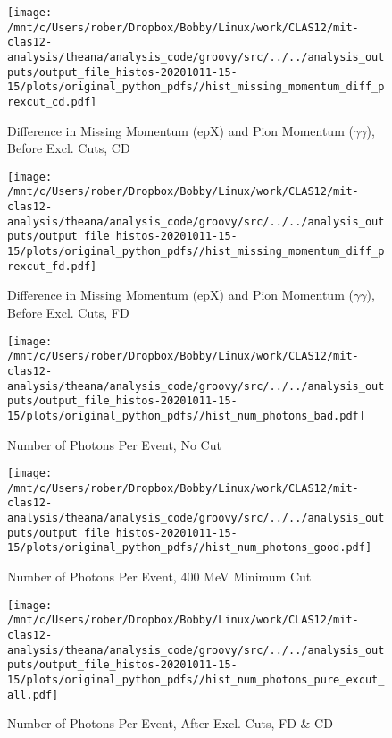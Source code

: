 \documentclass{article}
\begin{document}
\begin{landscape}
\begin{figure}[h]
        \texttt{[image: /mnt/c/Users/rober/Dropbox/Bobby/Linux/work/CLAS12/mit-clas12-analysis/theana/analysis\_code/groovy/src/../../analysis\_outputs/output\_file\_histos-20201011-15-15/plots/original\_python\_pdfs//hist\_missing\_momentum\_diff\_prexcut\_cd.pdf]}
        \captionsetup{textformat=empty,labelformat=blank}
        \caption{Difference in Missing Momentum (epX) and Pion Momentum ($\gamma$$\gamma$), Before Excl. Cuts, CD}
    \end{figure}
    \clearpage
    
    \begin{figure}[h]
        \centering

        \texttt{[image: /mnt/c/Users/rober/Dropbox/Bobby/Linux/work/CLAS12/mit-clas12-analysis/theana/analysis\_code/groovy/src/../../analysis\_outputs/output\_file\_histos-20201011-15-15/plots/original\_python\_pdfs//hist\_missing\_momentum\_diff\_prexcut\_fd.pdf]}
        \captionsetup{textformat=empty,labelformat=blank}
        \caption{Difference in Missing Momentum (epX) and Pion Momentum ($\gamma$$\gamma$), Before Excl. Cuts, FD}
    \end{figure}
    \clearpage
    
    \begin{figure}[h]
        \centering

        \texttt{[image: /mnt/c/Users/rober/Dropbox/Bobby/Linux/work/CLAS12/mit-clas12-analysis/theana/analysis\_code/groovy/src/../../analysis\_outputs/output\_file\_histos-20201011-15-15/plots/original\_python\_pdfs//hist\_num\_photons\_bad.pdf]}
        \captionsetup{textformat=empty,labelformat=blank}
        \caption{Number of Photons Per Event, No Cut}
    \end{figure}
    \clearpage
    
    \begin{figure}[h]
        \centering

        \texttt{[image: /mnt/c/Users/rober/Dropbox/Bobby/Linux/work/CLAS12/mit-clas12-analysis/theana/analysis\_code/groovy/src/../../analysis\_outputs/output\_file\_histos-20201011-15-15/plots/original\_python\_pdfs//hist\_num\_photons\_good.pdf]}
        \captionsetup{textformat=empty,labelformat=blank}
        \caption{Number of Photons Per Event, 400 MeV Minimum Cut}
    \end{figure}
    \clearpage
    
    \begin{figure}[h]
        \centering

        \texttt{[image: /mnt/c/Users/rober/Dropbox/Bobby/Linux/work/CLAS12/mit-clas12-analysis/theana/analysis\_code/groovy/src/../../analysis\_outputs/output\_file\_histos-20201011-15-15/plots/original\_python\_pdfs//hist\_num\_photons\_pure\_excut\_all.pdf]}
        \captionsetup{textformat=empty,labelformat=blank}
        \caption{Number of Photons Per Event, After Excl. Cuts, FD \& CD}
    \end{figure}
    \clearpage
    

\end{landscape}
\end{document}
